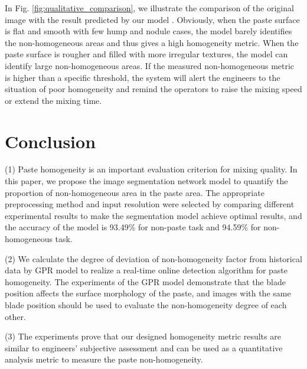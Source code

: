\documentclass[pdflatex,sn-mathphys]{sn-jnl}%
\theoremstyle{thmstyleone}%
\theoremstyle{thmstyletwo}%
\theoremstyle{thmstylethree}%
\begin{document}
In Fig. \ref{fig:qualitative_comparison}, we illustrate the comparison of the original image with the result predicted by our model . 
Obviously, when the paste surface is flat and smooth with few hump and nodule cases, the model barely identifies the non-homogeneous areas and thus gives a high homogeneity metric. 
When the paste surface is rougher and filled with more irregular textures, the model can identify large non-homogeneous areas.
If the measured non-homogeneous metric is higher than a specific threshold, the system will alert the engineers to the situation of poor homogeneity and remind the operators to raise the mixing speed or extend the mixing time.

\section{Conclusion}\label{sec6}

(1) Paste homogeneity is an important evaluation criterion for mixing quality. In this paper, we propose the image segmentation network model to quantify the proportion of non-homogeneous area in the paste area. The appropriate preprocessing method and input resolution were selected by comparing different experimental results to make the segmentation model achieve optimal results, and the accuracy of the model is 93.49\% for non-paste task and 94.59\% for non-homogeneous task.     

(2) We calculate the degree of deviation of non-homogeneity factor from historical data by GPR model to realize a real-time online detection algorithm for paste homogeneity. The experiments of the GPR model demonstrate that the blade position affects the surface morphology of the paste, and images with the same blade position should be used to evaluate the non-homogeneity degree of each other.        

(3) The experiments prove that our designed homogeneity metric results are similar to engineers' subjective assessment and can be used as a quantitative analysis metric to measure the paste non-homogeneity.



\end{document}
